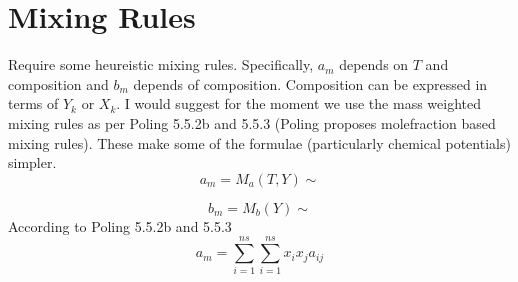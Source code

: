 \documentclass[11pt]{article}
\begin{document}
%
\section{Mixing Rules}
\label{sec:mix}

Require some heureistic mixing rules.
  Specifically, $a_m$ depends on $T$ and composition and $b_m$ depends of composition.  Composition
can be expressed in terms of $Y_k$ or $X_k$.  I would suggest for the moment we use the mass weighted
mixing rules as per Poling 5.5.2b and 5.5.3 (Poling proposes molefraction based mixing rules).  These make some of the formulae (particularly chemical
potentials) simpler.  
\begin{equation}
    a_m = M_a(T, Y) \sim 
\end{equation}

\begin{equation}
    b_m = M_b(Y) \sim 
\end{equation}
According to Poling 5.5.2b and 5.5.3
\begin{equation}
    a_m = \sum_{i=1}^{ns}  \sum_{i=1}^{ns} x_i x_j a_{ij}
\end{equation}
\end{document}

